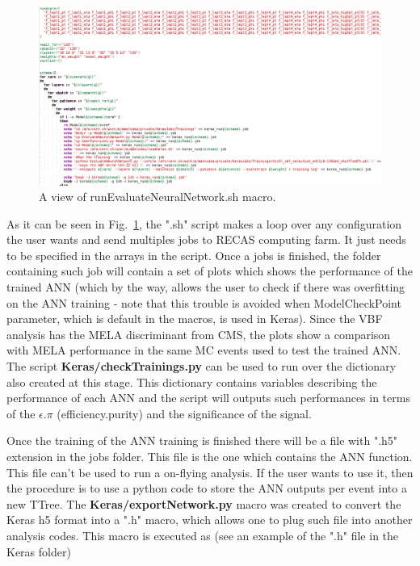 \documentclass[]{report}
\begin{document}
\begin{figure}
	\label{fig:evaluateneuralnetworksh}
	\centering
	\caption{A view of runEvaluateNeuralNetwork.sh macro.}
	\includegraphics[angle=90,scale=0.7]{figs/evaluateneuralnetworksh}
\end{figure}

As it can be seen in Fig.~\ref{fig:evaluateneuralnetworksh}, the ".sh" script makes a loop over any configuration the user wants and send multiples jobs to RECAS computing farm. It just needs to be specified in the arrays in the script. Once a jobs is finished, the folder containing such job will contain a set of plots which shows the performance of the trained ANN (which by the way, allows the user to check if there was overfitting on the ANN training - note that this trouble is avoided when ModelCheckPoint parameter, which is default in the macros, is used in Keras). Since the VBF analysis has the MELA discriminant from CMS, the plots show a comparison with MELA performance in the same MC events used to test the trained ANN. The script \textbf{Keras/checkTrainings.py} can be used to run over the dictionary also created at this stage. This dictionary contains variables describing the performance of each ANN and the script will outputs such performances in terms of the $\epsilon.\pi$ (efficiency.purity) and the significance of the signal. 

Once the training of the ANN training is finished there will be a file with ".h5" extension in the jobs folder. This file is the one which contains the ANN function. This file can't be used to run a on-flying analysis. If the user wants to use it, then the procedure is to use a python code to store the ANN outputs per event into a new TTree. The \textbf{Keras/exportNetwork.py} macro was created to convert the Keras h5 format into a ".h" macro, which allows one to plug such file into another analysis codes. This macro is executed as (see an example of the ".h" file in the Keras folder)
\end{document}
